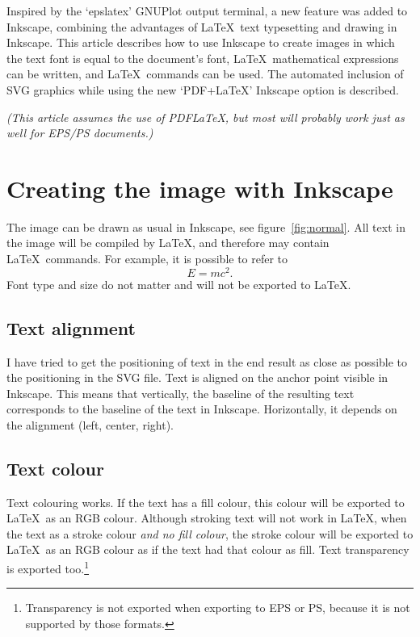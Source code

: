 \documentclass[final,3p,twocolumn]{elsarticle}
\begin{document}
Inspired by the `epslatex' GNUPlot output terminal, a new feature was added to Inkscape, combining the advantages of \LaTeX\ text typesetting and drawing in Inkscape. This article describes how to use Inkscape to create images in which the text font is equal to the document's font, \LaTeX\ mathematical expressions can be written, and \LaTeX\ commands can be used. 
The automated inclusion of SVG graphics while using the new `PDF+LaTeX' Inkscape option is described.

\emph{(This article assumes the use of PDFLaTeX, but most will probably work just as well for EPS/PS documents.)}

\section{Creating the image with Inkscape}

The image can be drawn as usual in Inkscape, see figure~\ref{fig:normal}. All text in the image will be compiled by \LaTeX, and therefore may contain \LaTeX\ commands. For example, it is possible to refer to 
\begin{equation}
  E = mc^2.	\label{eq:emc2}
\end{equation}
Font type and size do not matter and will not be exported to \LaTeX.

\subsection{Text alignment}
I have tried to get the positioning of text in the end result as close as possible to the positioning in the SVG file. Text is aligned on the anchor point visible in Inkscape. This means that vertically, the baseline of the resulting text corresponds to the baseline of the text in Inkscape. Horizontally, it depends on the alignment (left, center, right).

\subsection{Text colour}
Text colouring works. If the text has a fill colour, this colour will be exported to \LaTeX\ as an RGB colour. Although stroking text will not work in \LaTeX, when the text as a stroke colour \emph{and no fill colour}, the stroke colour will be exported to \LaTeX\ as an RGB colour as if the text had that colour as fill. Text transparency is exported too.\footnote{Transparency is not exported when exporting to EPS or PS, because it is not supported by those formats.}
\end{document}
